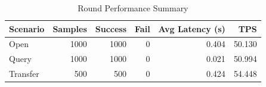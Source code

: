 \begin{table}
\caption{Round Performance Summary}
\label{tab:round_perf}
\begin{tabular}{lrrrrr}
\toprule
Scenario & Samples & Success & Fail & Avg Latency (s) & TPS \\
\midrule
Open & 1000 & 1000 & 0 & 0.404 & 50.130 \\
Query & 1000 & 1000 & 0 & 0.021 & 50.994 \\
Transfer & 500 & 500 & 0 & 0.424 & 54.448 \\
\bottomrule
\end{tabular}
\end{table}
